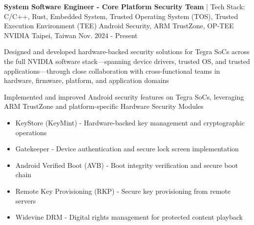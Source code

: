 

\begin{cventries}

  \cventry
    {\textbf {System Software Engineer - Core Platform Security Team} | \color{awesome} Tech Stack: C/C++, Rust, Embedded System, Trusted Operating System (TOS), Trusted Execution Environment (TEE) Android Security, ARM TrustZone, OP-TEE} %
    {NVIDIA} %
    {Taipei, Taiwan} %
    {Nov. 2024 - Present} %
    {
      \begin{cvitems} %
        \item {Designed and developed hardware-backed security solutions for Tegra SoCs across the full NVIDIA software stack—spanning device drivers, trusted OS, and trusted applications—through close collaboration with cross-functional teams in hardware, firmware, platform, and application domains}
        \item {Implemented and improved Android security features on Tegra SoCs, leveraging ARM TrustZone and platform-specific Hardware Security Modules}
        \begin{itemize}
          \item KeyStore (KeyMint) - Hardware-backed key management and cryptographic operations
          \item Gatekeeper - Device authentication and secure lock screen implementation
          \item Android Verified Boot (AVB) - Boot integrity verification and secure boot chain
          \item Remote Key Provisioning (RKP) - Secure key provisioning from remote servers
          \item Widevine DRM - Digital rights management for protected content playback
        \end{itemize}
      \end{cvitems}
    }


\end{cventries}
